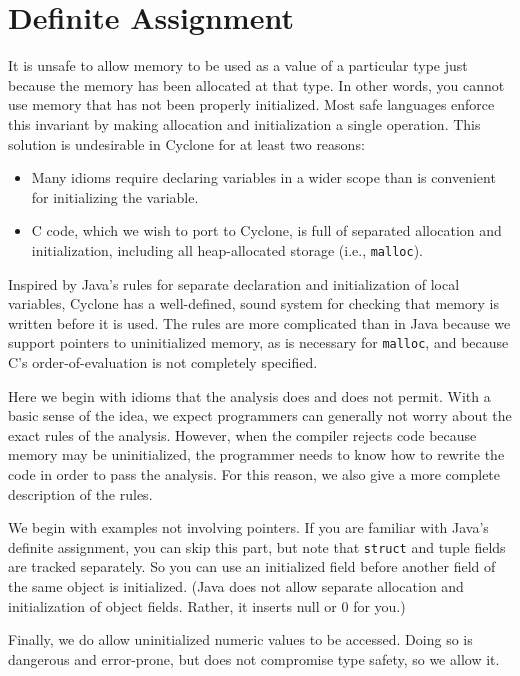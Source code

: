 \section{Definite Assignment}
 
It is unsafe to allow memory to be used as a value of a particular
type just because the memory has been allocated at that type.  In
other words, you cannot use memory that has not been properly
initialized.  Most safe languages enforce this invariant by making
allocation and initialization a single operation.  This solution is
undesirable in Cyclone for at least two reasons:
\begin{itemize}
\item Many idioms require declaring variables in a wider scope than is
  convenient for initializing the variable.
\item C code, which we wish to port to Cyclone, is full of separated
  allocation and initialization, including all heap-allocated storage
  (i.e., \texttt{malloc}).
\end{itemize}

Inspired by Java's rules for separate declaration and initialization
of local variables, Cyclone has a well-defined, sound system for
checking that memory is written before it is used.  The rules are more
complicated than in Java because we support pointers to uninitialized
memory, as is necessary for \texttt{malloc}, and because C's
order-of-evaluation is not completely specified.

Here we begin with idioms that the analysis does and does not permit.
With a basic sense of the idea, we expect programmers can generally
not worry about the exact rules of the analysis.  However, when the
compiler rejects code because memory may be uninitialized, the
programmer needs to know how to rewrite the code in order to pass the
analysis.  For this reason, we also give a more complete description
of the rules.

We begin with examples not involving pointers.  If you are familiar
with Java's definite assignment, you can skip this part, but note that
\texttt{struct} and tuple fields are tracked separately.  So you can use
an initialized field before another field of the same object is
initialized.  (Java does not allow separate allocation and
initialization of object fields.  Rather, it inserts null or 0 for
you.)

Finally, we do allow uninitialized numeric values to be accessed.
Doing so is dangerous and error-prone, but does not compromise type
safety, so we allow it.

